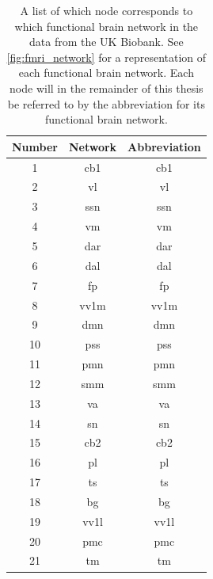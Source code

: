 \begin{table}[!htbp]
    \centering
    \caption{A list of which node corresponds to which functional brain network in the data from the UK Biobank. See \cref{fig:fmri_network} for a representation of each functional brain network. Each node will in the remainder of this thesis be referred to by the abbreviation for its functional brain network.}
    \begin{tabular}{||c|c|c||}
        \hline
        Number & Network & Abbreviation  \\ \hline\hline
        1 & \acrlong{cb1} & \acrshort{cb1} \\ \hline
        2 & \acrlong{vl} & \acrshort{vl}  \\ \hline
        3 & \acrlong{ssn} & \acrshort{ssn} \\ \hline
        4 & \acrlong{vm} &  \acrshort{vm}\\ \hline
        5 & \acrlong{dar} & \acrshort{dar} \\ \hline
        6 & \acrlong{dal} &  \acrshort{dal} \\ \hline
        7 & \acrlong{fp} &  \acrshort{fp}\\ \hline
        8 & \acrlong{vv1m} & \acrshort{vv1m} \\ \hline
        9 & \acrlong{dmn} &  \acrshort{dmn} \\ \hline
        10 & \acrlong{pss} & \acrshort{pss} \\ \hline
        11 & \acrlong{pmn} & \acrshort{pmn} \\ \hline
        12 & \acrlong{smm} & \acrshort{smm}  \\ \hline
        13 & \acrlong{va} &  \acrshort{va}\\ \hline
        14 & \acrlong{sn} &  \acrshort{sn}\\ \hline
        15 & \acrlong{cb2} & \acrshort{cb2} \\ \hline
        16 & \acrlong{pl} & \acrshort{pl} \\ \hline
        17 & \acrlong{ts} & \acrshort{ts} \\ \hline
        18 & \acrlong{bg} &  \acrshort{bg} \\ \hline
        19 & \acrlong{vv1l} & \acrshort{vv1l} \\ \hline
        20 & \acrlong{pmc} & \acrshort{pmc} \\ \hline
        21 & \acrlong{tm} & \acrshort{tm} \\ \hline
    \end{tabular}
    \label{tab:Networks}
\end{table}


